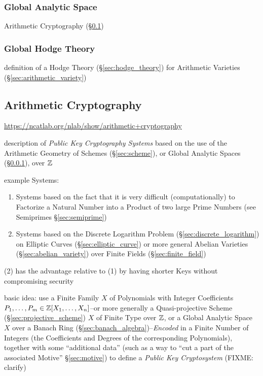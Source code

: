 \subsubsection{Global Analytic Space}\label{sec:global_analytic_space}

\fist Arithmetic Cryptography (\S\ref{sec:arithmetic_cryptography})



\subsubsection{Global Hodge Theory}\label{sec:global_hodge_theory}

definition of a Hodge Theory (\S\ref{sec:hodge_theory}) for Arithmetic
Varieties (\S\ref{sec:arithmetic_variety})



\subsection{Arithmetic Cryptography}\label{sec:arithmetic_cryptography}

\url{https://ncatlab.org/nlab/show/arithmetic+cryptography}

description of \emph{Public Key Cryptography Systems} based on the use of the
Arithmetic Geometry of Schemes (\S\ref{sec:scheme}), or Global Analytic Spaces
(\S\ref{sec:global_analytic_space}), over $\mathbb{Z}$

example Systems:
\begin{enumerate}
  \item Systems based on the fact that it is very difficult (computationally)
    to Factorize a Natural Number into a Product of two large Prime Numbers
    (see Semiprimes \S\ref{sec:semiprime})
  \item Systems based on the Discrete Logarithm Problem
    (\S\ref{sec:discrete_logarithm}) on Elliptic Curves
    (\S\ref{sec:elliptic_curve}) or more general Abelian Varieties
    (\S\ref{sec:abelian_variety}) over Finite Fields (\S\ref{sec:finite_field})
\end{enumerate}
(2) has the advantage relative to (1) by having shorter Keys without
compromising security

basic idea: use a Finite Family $X$ of Polynomials with Integer Coefficients
$P_1, \ldots, P_m \in \mathbb{Z}[X_1, \ldots, X_n]$--or more generally a
Quasi-projective Scheme (\S\ref{sec:projective_scheme}) $X$ of Finite Type over
$\mathbb{Z}$, or a Global Analytic Space $X$ over a Banach Ring
(\S\ref{sec:banach_algebra})--\emph{Encoded} in a Finite Number of Integers
(the Coefficients and Degrees of the corresponding Polynomials), together with
some ``additional data'' (such as a way to ``cut a part of the associated
Motive'' \S\ref{sec:motive}) to define a \emph{Public Key Cryptosystem}
(FIXME: clarify)

